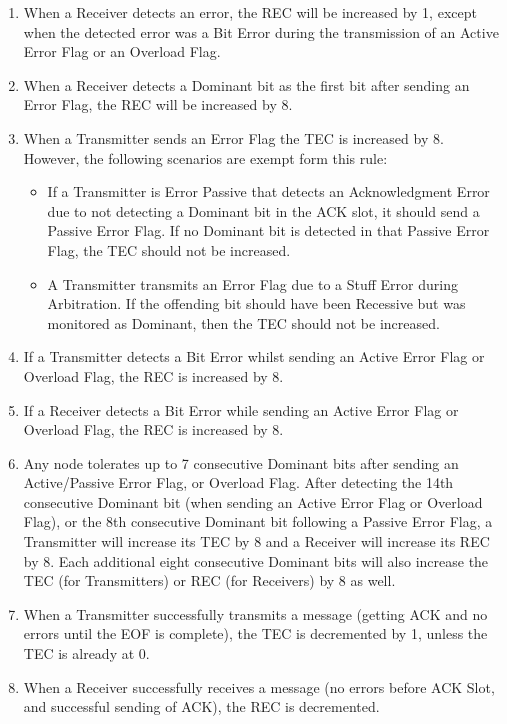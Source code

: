 \documentclass[main\_\_EN.tex]{subfiles}
\begin{document}
\begin{enumerate}
    \item When a Receiver detects an error, the REC will be increased by 1, except when the detected error was a Bit Error during the transmission of an Active Error Flag or an Overload Flag.
    \item When a Receiver detects a Dominant bit as the first bit after sending an Error Flag, the REC will be increased by 8.
    \item When a Transmitter sends an Error Flag the TEC is increased by 8. However, the following scenarios are exempt form this rule:
    \begin{itemize}
        \item If a Transmitter is Error Passive that detects an Acknowledgment Error due to not detecting a Dominant bit in the ACK slot, it should send a Passive Error Flag. If no Dominant bit is detected in that Passive Error Flag, the TEC should not be increased.
        \item A Transmitter transmits an Error Flag due to a Stuff Error during Arbitration. If the offending bit should have been Recessive but was monitored as Dominant, then the TEC should not be increased.
    \end{itemize}
    \item If a Transmitter detects a Bit Error whilst sending an Active Error Flag or Overload Flag, the REC is increased by 8.
    \item If a Receiver detects a Bit Error while sending an Active Error Flag or Overload Flag, the REC is increased by 8.
    \item Any node tolerates up to 7 consecutive Dominant bits after sending an Active/Passive Error Flag, or Overload Flag. After detecting the 14th consecutive Dominant bit (when sending an Active Error Flag or Overload Flag), or the 8th consecutive Dominant bit following a Passive Error Flag, a Transmitter will increase its TEC by 8 and a Receiver will increase its REC by 8. Each additional eight consecutive Dominant bits will also increase the TEC (for Transmitters) or REC (for Receivers) by 8 as well.
    \item When a Transmitter successfully transmits a message (getting ACK and no errors until the EOF is complete), the TEC is decremented by 1, unless the TEC is already at 0.
    \item When a Receiver successfully receives a message (no errors before ACK Slot, and successful sending of ACK), the REC is decremented.
    \begin{itemize}

\end{itemize}
\end{enumerate}
\end{document}
